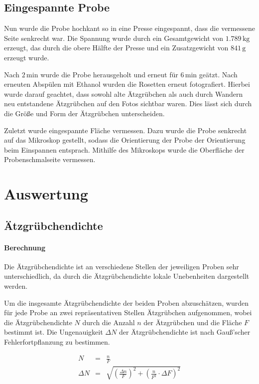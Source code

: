 \documentclass[12pt,a4paper]{scrartcl}
\numberwithin{equation}{section} %
\renewcommand{\[}{} %
\renewcommand{\]}{\noindent} %
\begin{document}
\hypertarget{eingespannte-probe}{%
\subsection{Eingespannte Probe}\label{eingespannte-probe}}

Nun wurde die Probe hochkant so in eine Presse eingespannt, dass die
vermessene Seite senkrecht war. Die Spannung wurde durch ein
Gesamtgewicht von \(1.789\mathrm{\,kg}\) erzeugt, das durch die obere
Hälfte der Presse und ein Zusatzgewicht von \(841\mathrm{\,g}\) erzeugt
wurde.

Nach \(2\mathrm{\,min}\) wurde die Probe herausgeholt und erneut für
\(6\mathrm{\,min}\) geätzt. Nach erneuten Abspülen mit Ethanol wurden
die Rosetten erneut fotografiert. Hierbei wurde darauf geachtet, dass
sowohl alte Ätzgrübchen als auch durch Wandern neu entstandene
Ätzgrübchen auf den Fotos sichtbar waren. Dies lässt sich durch die
Größe und Form der Ätzgrübchen unterscheiden.

Zuletzt wurde eingespannte Fläche vermessen. Dazu wurde die Probe
senkrecht auf das Mikroskop gestellt, sodass die Orientierung der Probe
der Orientierung beim Einspannen entsprach. Mithilfe des Mikroskops
wurde die Oberfläche der Probenschmalseite vermessen.

\hypertarget{auswertung}{%
\section{Auswertung}\label{auswertung}}

\hypertarget{uxe4tzgruxfcbchendichte}{%
\subsection{Ätzgrübchendichte}\label{uxe4tzgruxfcbchendichte}}

\hypertarget{berechnung}{%
\paragraph*{Berechnung}\label{berechnung}}

Die Ätzgrübchendichte ist an verschiedene Stellen der jeweiligen Proben
sehr unterschiedlich, da durch die Ätzgrübchendichte lokale Unebenheiten
dargestellt werden.

Um die insgesamte Ätzgrübchendichte der beiden Proben abzuschätzen,
wurden für jede Probe an zwei repräsentativen Stellen Ätzgrübchen
aufgenommen, wobei die Ätzgrübchendichte \(N\) durch die Anzahl \(n\)
der Ätzgrübchen und die Fläche \(F\) bestimmt ist. Die Ungenauigkeit
\(\Delta N\) der Ätzgrübchendichte ist nach Gauß'scher
Fehlerfortpflanzung zu bestimmen.
\[
\begin{eqnarray}
    N &=& \frac{n}{F} \label{N}\\
    \Delta N &=& \sqrt{
        \left(\frac{\Delta n}{F}\right)^2
        + \left(\frac{n}{F^2} \cdot \Delta F\right)^2} \label{DeltaN}
\end{eqnarray}
\]
\end{document}
